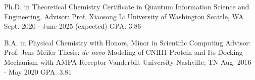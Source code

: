 


\begin{cventries}


\cventry
{Ph.D. in Theoretical Chemistry \newline
Certificate in Quantum Information Science and Engineering, \newline
Advisor: Prof. Xiaosong Li} %
{University of Washington} %
{Seattle, WA\vspace{-0.5cm}} %
{Sept. 2020 - June 2025 (expected)} %
{GPA: 3.86} %



\cventry
{B.A. in Physical Chemistry with Honors, Minor in Scientific Computing \newline
Advisor: Prof. Jens Meiler \newline
Thesis: \textit{de novo} Modeling of CNIH1 Protein and Its Docking Mechanism with AMPA Receptor}%
{Vanderbilt University} %
{Nashville, TN} %
{Aug. 2016 - May 2020} %
{GPA: 3.81} %


\end{cventries}
